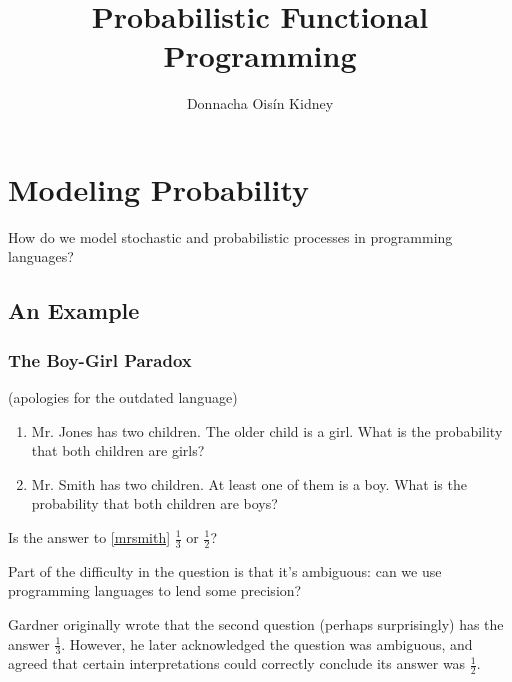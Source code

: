 \documentclass[usenames,dvipsnames]{beamer}
\title{Probabilistic Functional Programming}
\author{Donnacha Oisín Kidney}
\begin{document}
\frame{\titlepage}
\begin{frame}
  \begin{multicols}{2}
    \tableofcontents
  \end{multicols}
\end{frame}
\section{Modeling Probability}
\begin{frame}
  How do we model stochastic and probabilistic processes in programming
  languages?
\end{frame}
\subsection{An Example}
\begin{frame}
  \frametitle{The Boy-Girl Paradox}
  (apologies for the outdated language)
  \begin{enumerate}
    \item Mr. Jones has two children. The older child is a girl. What is the
      probability that both children are girls?
    \item \label{mrsmith} Mr. Smith has two children. At least one of them is a
      boy. What is the probability that both children are boys?
  \end{enumerate}
  \pause
  Is the answer to \ref{mrsmith} $\frac{1}{3}$ or $\frac{1}{2}$?
  \pause

  Part of the difficulty in the question is that it's ambiguous: can we use
  programming languages to lend some precision?
\end{frame}
\begin{frame}
  Gardner originally wrote that the second question (perhaps surprisingly) has
  the answer $\frac{1}{3}$. However, he later acknowledged the question was
  ambiguous, and agreed that certain interpretations could correctly conclude
  its answer was $\frac{1}{2}$.
\end{frame}
\end{document}
